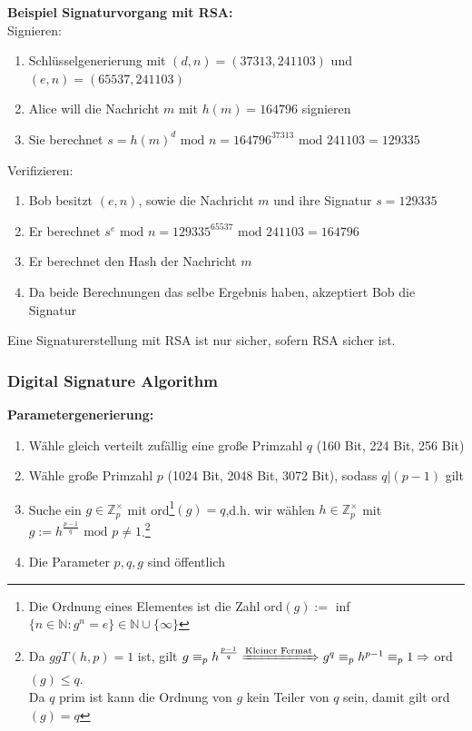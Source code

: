 \documentclass[a4paper,12pt,leqno]{article}
\begin{document}
\textbf{Beispiel Signaturvorgang mit RSA:}\\
Signieren:
\begin{enumerate}
\item Schlüsselgenerierung mit $(d,n)=(37313,241103)$ und $(e,n)=(65537,241103)$
\item Alice will die Nachricht $m$ mit $h(m)=164796$ signieren
\item Sie berechnet $s=h(m)^d\textrm{ mod }n=164796^{37313}\textrm{ mod }241103=129335$ 
\end{enumerate}
Verifizieren:
\begin{enumerate}
\item Bob besitzt $(e,n)$, sowie die Nachricht $m$ und ihre Signatur $s=129335$
\item Er berechnet $s^e\textrm{ mod }n=129335^{65537}\textrm{ mod }241103=164796$
\item Er berechnet den Hash der Nachricht $m$
\item Da beide Berechnungen das selbe Ergebnis haben, akzeptiert Bob die Signatur
\end{enumerate}
Eine Signaturerstellung mit RSA ist nur sicher, sofern RSA sicher ist.

\subsubsection{Digital Signature Algorithm}

\textbf{Parametergenerierung:}
\begin{enumerate}
\item Wähle gleich verteilt zufällig eine große Primzahl $q$ (160 Bit, 224 Bit, 256 Bit)
\item Wähle große Primzahl $p$ (1024 Bit, 2048 Bit, 3072 Bit), sodass $q|(p-1)$ gilt
\item Suche ein $g\in\mathbb{Z}_p^\times$ mit ord\footnote{Die Ordnung eines Elementes ist die Zahl ord$(g):=$ inf$\{n\in\mathbb{N}:g^n=e\}\in\mathbb{N}\cup\{\infty\}$}$(g)=q$,d.h. wir wählen $h\in\mathbb{Z}_p^\times$ mit $g:=h^{\frac{p-1}{q}}\textrm{ mod } p \neq 1$.\footnote{ Da $ggT(h,p)=1$ ist, gilt $g\equiv_p h^{\frac{p-1}{q}}\xRightarrow{\text{Kleiner Fermat}}g^q\equiv_p h^{p-1}\equiv_p 1\Rightarrow$ ord$(g)\leq q$.\\ Da $q$ prim ist kann die Ordnung von $g$ kein Teiler von $q$ sein, damit gilt ord$(g)=q$}
\item Die Parameter $p,q,g$ sind öffentlich
\end{enumerate}
\end{document}
